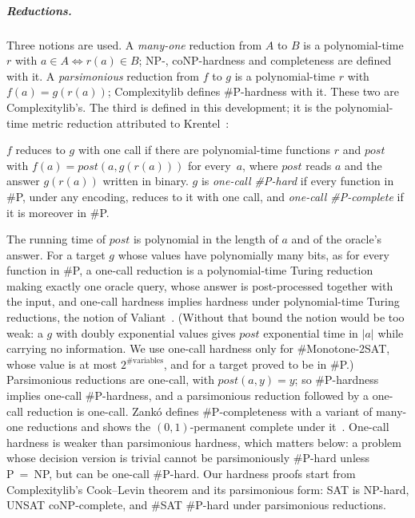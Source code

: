 \documentclass[a4paper,UKenglish,cleveref,autoref,thm-restate]{lipics-v2021}
\begin{document}
\subparagraph*{Reductions.}
Three notions are used. A \emph{many-one} reduction from $A$ to $B$ is a polynomial-time $r$
with $a \in A \iff r(a) \in B$; NP-, coNP-hardness and completeness are defined with it. A
\emph{parsimonious} reduction from $f$ to $g$ is a polynomial-time $r$ with $f(a) = g(r(a))$;
Complexitylib defines \#P-hardness with it. These two are Complexitylib's. The third is defined
in this development; it is the polynomial-time metric reduction attributed to
Krentel~\cite{Krentel1988}:
\begin{definition}
\label{def:onecall}
$f$ reduces to $g$ with one call if there are polynomial-time functions $r$ and
$\mathit{post}$ with $f(a) = \mathit{post}(a, g(r(a)))$ for every~$a$, where $\mathit{post}$
reads $a$ and the answer $g(r(a))$ written in binary. $g$ is \emph{one-call \#P-hard} if every
function in \#P, under any encoding, reduces to it with one call, and \emph{one-call
\#P-complete} if it is moreover in \#P.
\end{definition}
The running time of $\mathit{post}$ is polynomial in the length of $a$ and of the oracle's
answer. For a target $g$ whose values have polynomially many bits, as for every function in
\#P, a one-call reduction is a polynomial-time Turing reduction making exactly one oracle query,
whose answer is post-processed together with the input, and one-call hardness implies hardness
under polynomial-time Turing reductions, the notion of Valiant~\cite{Valiant1979enumeration}.
(Without that bound the notion would be too weak: a $g$ with doubly exponential values gives
$\mathit{post}$ exponential time in $|a|$ while carrying no information. We use one-call
hardness only for \#Monotone-2SAT, whose value is at most $2^{\#\text{variables}}$, and for a
target proved to be in \#P.) Parsimonious reductions are one-call, with
$\mathit{post}(a, y) = y$; so \#P-hardness implies one-call \#P-hardness, and a
parsimonious reduction followed by a one-call reduction is one-call.
Zank\'o defines \#P-completeness with a variant of many-one reductions and shows the
$(0,1)$-permanent complete under it~\cite{Zanko1991}. One-call hardness is weaker than parsimonious
hardness, which matters below: a problem whose decision version
is trivial cannot be parsimoniously \#P-hard unless P~=~NP, but can be one-call \#P-hard.
Our hardness proofs start from Complexitylib's Cook--Levin theorem and its parsimonious form:
SAT is NP-hard, UNSAT coNP-complete, and \#SAT \#P-hard under parsimonious reductions.
\end{document}
